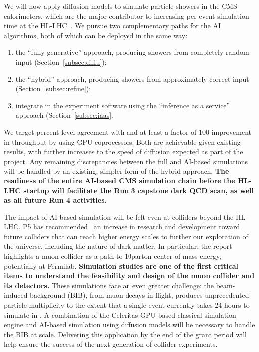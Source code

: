 We will now apply diffusion models to simulate particle showers in the CMS calorimeters, which are the major contributor to increasing per-event simulation time at the HL-LHC~\cite{Pedro:2020kbk}.
We pursue two complementary paths for the AI algorithms, both of which can be deployed in the same way:
\begin{enumerate}
\item the ``fully generative'' approach, producing showers from completely random input (Section~\ref{subsec:diffu});
\item the ``hybrid'' approach, producing showers from approximately correct input (Section~\ref{subsec:refine});
\item integrate in the experiment software using the ``inference as a service'' approach (Section~\ref{subsec:iaas}.
\end{enumerate}
We target percent-level agreement with \GEANTfour and at least a factor of 100 improvement in throughput by using GPU coprocessors.
Both are achievable given existing results, with further increases to the speed of diffusion expected as part of the project.
Any remaining discrepancies between the full and AI-based simulations will be handled by an existing, simpler form of the hybrid approach.
\textbf{The readiness of the entire AI-based CMS simulation chain before the HL-LHC startup will facilitate the Run 3 capstone dark QCD scan, as well as all future Run 4 activities.}

The impact of AI-based simulation will be felt even at colliders beyond the HL-LHC.
P5 has recommended~\cite{P5:2023} an increase in research and development toward future colliders that can reach higher energy scales
to further our exploration of the universe, including the nature of dark matter.
In particular, the report highlights a muon collider as a path to 10\TeV parton center-of-mass energy, potentially at Fermilab.
\textbf{Simulation studies are one of the first critical items to understand the feasibility and design of the muon collider and its detectors.}
These simulations face an even greater challenge: the beam-induced background (BIB), from muon decays in flight, produces unprecedented particle multiplicity
to the extent that a single event currently takes 24 hours to simulate in \GEANTfour.
A combination of the Celeritas GPU-based classical simulation engine and AI-based simulation using diffusion models will be necessary to handle the BIB at scale.
Delivering this application by the end of the grant period will help ensure the success of the next generation of collider experiments.

